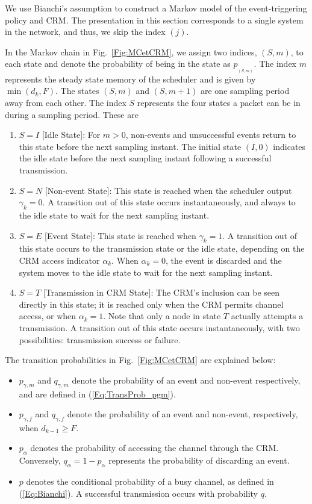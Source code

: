 \documentclass[journal]{IEEEtran}
\begin{document}
We use Bianchi's assumption to construct a Markov model of the event-triggering policy and CRM. The presentation in this section corresponds to a single system in the network, and thus, we skip the index $(j)$.

In the Markov chain in Fig.~\ref{Fig:MCetCRM}, we assign two indices, $(S,m)$, to each state and denote the probability of being in the state as $p_{_{(S,m)}}$. The index $m$ represents the steady state memory of the scheduler and is given by $\min(d_k,F)$. The states $(S,m)$ and $(S,m+1)$ are one sampling period away from each other. The index $S$ represents the four states a packet can be in during a sampling period. These are
\begin{enumerate}
\item $S=I$ [Idle State]: For $m>0$, non-events and unsuccessful events return to this state before the next sampling instant. The initial state $(I,0)$ indicates the idle state before the next sampling instant following a successful transmission.
\item $S=N$ [Non-event State]: This state is reached when the scheduler output $\gamma_k=0$. A transition out of this state occurs instantaneously, and always to the idle state to wait for the next sampling instant.
\item $S=E$ [Event State]: This state is reached when $\gamma_k=1$. A transition out of this state occurs to the transmission state or the idle state, depending on the CRM access indicator $\alpha_k$. When $\alpha_k=0$, the event is discarded and the system moves to the idle state to wait for the next sampling instant.
\item $S=T$ [Transmission in CRM State]: The CRM's inclusion can be seen directly in this state; it is reached only when the CRM permits channel access, or when $\alpha_k=1$. Note that only a node in state $T$ actually attempts a transmission. A transition out of this state occurs instantaneously, with two possibilities: transmission success or failure.
\end{enumerate}

The transition probabilities in Fig.~\ref{Fig:MCetCRM} are explained below:
\begin{itemize}
\item $p_{\gamma,m}$ and $q_{\gamma,m}$ denote the probability of an event and non-event respectively, and are defined in (\ref{Eq:TransProb_pgm}).
\item $p_{\gamma,f}$ and $q_{\gamma,f}$ denote the probability of an event and non-event, respectively, when $d_{k-1} \ge F$.
\item $p_\alpha$ denotes the probability of accessing the channel through the CRM. Conversely, $q_\alpha = 1-p_\alpha$ represents the probability of discarding an event.
\item $p$ denotes the conditional probability of a busy channel, as defined in (\ref{Eq:Bianchi}). A successful transmission occurs with probability $q$.
\end{itemize}
\end{document}
